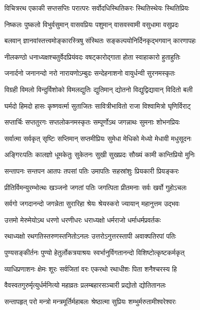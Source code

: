 \twolineshloka
{विचित्ररथ एकाकी सप्तसप्तिः परात्परः}
{सर्वोदधिस्थितिकरः स्थितिस्थेयः स्थितिप्रियः}%

\twolineshloka
{निष्कलः पुष्कलो विभुर्वसुमान् वासवप्रियः}
{पशुमान् वासवस्वामी वसुधामा वसुप्रदः}%

\twolineshloka
{बलवान् ज्ञानवांस्तत्त्वमोङ्कारस्त्रिषु संस्थितः}
{सङ्कल्पयोनिर्दिनकृद्भगवान् कारणापहः}%

\twolineshloka
{नीलकण्ठो धनाध्यक्षश्चतुर्वेदप्रियंवदः}
{वषट्कारोद्गाता होता स्वाहाकारो हुताहुतिः}%

\twolineshloka
{जनार्दनो जनानन्दो नरो नारायणोऽम्बुदः}
{सन्देहनाशनो वायुर्धन्वी सुरनमस्कृतः}%

\twolineshloka
{विग्रही विमलो विन्दुर्विशोको विमलद्युतिः}
{द्युतिमान् द्योतनो विद्युद्विद्यावान् विदितो बली}%

\twolineshloka
{घर्मदो हिमदो हासः कृष्णवर्त्मा सुताजितः}
{सावित्रीभावितो राजा विश्वामित्रो घृणिर्विराट्}%

\twolineshloka
{सप्तार्चिः सप्ततुरगः सप्तलोकनमस्कृतः}
{सम्पूर्णोऽथ जगन्नाथः सुमनाः शोभनप्रियः}%

\twolineshloka
{सर्वात्मा सर्वकृत् सृष्टिः सप्तिमान् सप्तमीप्रियः}
{सुमेधा मेधिको मेध्यो मेधावी मधुसूदनः}%

\twolineshloka
{अङ्गिरःपतिः कालज्ञो धूमकेतुः सुकेतनः}
{सुखी सुखप्रदः सौख्यं कामी कान्तिप्रियो मुनिः}%

\twolineshloka
{सन्तापनः सन्तपन आतपः तपसां पतिः}
{उमापतिः सहस्रांशुः प्रियकारी प्रियङ्करः}%

\twolineshloka
{प्रीतिर्विमन्युरम्भोत्थः खञ्जनो जगतां पतिः}
{जगत्पिता प्रीतमनाः सर्वः खर्वो गुहोऽचलः}%

\twolineshloka
{सर्वगो जगदानन्दो जगन्नेता सुरारिहा}
{श्रेयः श्रेयस्करो ज्यायान् महानुत्तम उद्भवः}%

\twolineshloka
{उत्तमो मेरुमेयोऽथ धरणो धरणीधरः}
{धराध्यक्षो धर्मराजो धर्माधर्मप्रवर्तकः}%

\twolineshloka
{रथाध्यक्षो रथगतिस्तरुणस्तनितोऽनलः}
{उत्तरोऽनुत्तरस्तापी अवाक्पतिरपां पतिः}%

\twolineshloka
{पुण्यसङ्कीर्तनः पुण्यो हेतुर्लोकत्रयाश्रयः}
{स्वर्भानुर्विगतानन्दो विशिष्टोत्कृष्टकर्मकृत्}%

\twolineshloka
{व्याधिप्रणाशनः क्षेमः शूरः सर्वजितां वरः}
{एकरथो रथाधीशः पिता शनैश्चरस्य हि}%

\twolineshloka
{वैवस्वतगुरुर्मृत्युर्धर्मनित्यो महाव्रतः}
{प्रलम्बहारसञ्चारी प्रद्योतो द्योतितानलः}%

\twolineshloka
{सन्तापहृत् परो मन्त्रो मन्त्रमूर्तिर्महाबलः}
{श्रेष्ठात्मा सुप्रियः शम्भुर्मरुतामीश्वरेश्वरः}%

